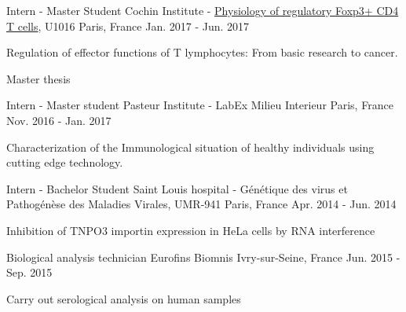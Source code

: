 \begin{cventries}
  \cventry
    {Intern - Master Student}%
    {Cochin Institute - \href{https://www.institutcochin.fr/departments/3i/team-lucas/physiology-of-regulatory-foxp3-cd4-t-cells}{Physiology of regulatory Foxp3+ CD4 T cells}, U1016} %
    {Paris, France} %
    {Jan. 2017 - Jun. 2017} %
    {
      \begin{cvitems} %
        \item {Regulation of effector functions of T lymphocytes: From basic research to cancer.}
        \item {Master thesis}
      \end{cvitems}
    }

%


  \cventry
    {Intern - Master student} %
    {Pasteur Institute - LabEx Milieu Interieur} %
    {Paris, France} %
    {Nov. 2016 - Jan. 2017} %
    {
      \begin{cvitems} %
        \item {Characterization of the Immunological situation of healthy individuals using cutting edge technology.}
      \end{cvitems}
    }

  \cventry
    {Intern - Bachelor Student} %
    {Saint Louis hospital - Génétique des virus et Pathogénèse des Maladies Virales, UMR-941} %
    {Paris, France} %
    {Apr. 2014 - Jun. 2014} %
    {
      \begin{cvitems} %
        \item {Inhibition of TNPO3 importin expression in HeLa cells by RNA interference}
      \end{cvitems}
    }

  \cventry
    {Biological analysis technician} %
    {Eurofins Biomnis} %
    {Ivry-sur-Seine, France} %
    {Jun. 2015 - Sep. 2015} %
    {
      \begin{cvitems} %
        \item {Carry out serological analysis on human samples}
      \end{cvitems}
    }
    
\end{cventries}

